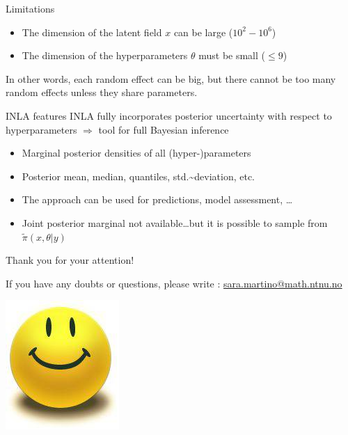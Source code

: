 \documentclass[
  ignorenonframetext,
]{beamer}
\providecommand{\tightlist}{%
  \setlength{\itemsep}{0pt}\setlength{\parskip}{0pt}}
\begin{document}
\begin{frame}{Limitations}
\protect\hypertarget{limitations}{}
\begin{itemize}
\item
  The dimension of the latent field \(x\) can be large (\(10^2-10^6\))
\item
  The dimension of the hyperparameters \(\theta\) must be small
  (\(\leq 9\))
\end{itemize}

In other words, each random effect can be big, but there cannot be too
many random effects unless they share parameters.
\end{frame}

\begin{frame}{INLA features}
\protect\hypertarget{inla-features}{}
INLA fully incorporates posterior uncertainty with respect to
hyperparameters \(\Rightarrow\) tool for full Bayesian inference

\begin{itemize}
\tightlist
\item
  Marginal posterior densities of all (hyper-)parameters
\item
  Posterior mean, median, quantiles, std.\textasciitilde deviation, etc.
\item
  The approach can be used for predictions, model assessment, \ldots
\item
  Joint posterior marginal not available\ldots but it is possible to
  sample from \(\widetilde{\pi}(x,\theta|y)\)
\end{itemize}
\end{frame}

\begin{frame}{}
\protect\hypertarget{section}{}
\Large

Thank you for your attention!

\normalsize

If you have any doubts or questions, please write :
\url{sara.martino@math.ntnu.no}

\begin{center}\includegraphics[width=0.3\linewidth]{graphics/smiley_small} \end{center}
\end{frame}
\end{document}
